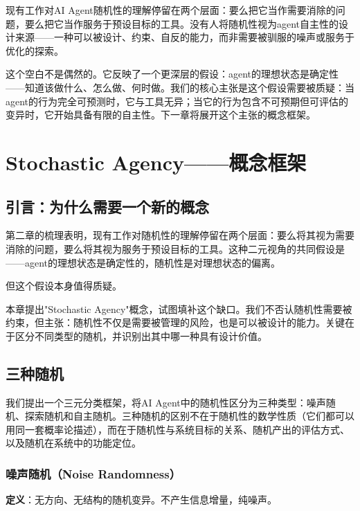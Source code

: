 \documentclass[12pt,a4paper]{ctexart}
\begin{document}
现有工作对AI Agent随机性的理解停留在两个层面：要么把它当作需要消除的问题，要么把它当作服务于预设目标的工具。没有人将随机性视为agent自主性的设计来源——一种可以被设计、约束、自反的能力，而非需要被驯服的噪声或服务于优化的探索。

这个空白不是偶然的。它反映了一个更深层的假设：agent的理想状态是确定性——知道该做什么、怎么做、何时做。我们的核心主张是这个假设需要被质疑：当agent的行为完全可预测时，它与工具无异；当它的行为包含不可预期但可评估的变异时，它开始具备有限的自主性。下一章将展开这个主张的概念框架。


\section{Stochastic Agency——概念框架}

\subsection{引言：为什么需要一个新的概念}

第二章的梳理表明，现有工作对随机性的理解停留在两个层面：要么将其视为需要消除的问题，要么将其视为服务于预设目标的工具。这种二元视角的共同假设是——agent的理想状态是确定性的，随机性是对理想状态的偏离。

但这个假设本身值得质疑。

本章提出"Stochastic Agency"概念，试图填补这个缺口。我们不否认随机性需要被约束，但主张：随机性不仅是需要被管理的风险，也是可以被设计的能力。关键在于区分不同类型的随机，并识别出其中哪一种具有设计价值。

\subsection{三种随机}

我们提出一个三元分类框架，将AI Agent中的随机性区分为三种类型：噪声随机、探索随机和自主随机。三种随机的区别不在于随机性的数学性质（它们都可以用同一套概率论描述），而在于随机性与系统目标的关系、随机产出的评估方式、以及随机在系统中的功能定位。

\subsubsection{噪声随机（Noise Randomness）}

\textbf{定义}：无方向、无结构的随机变异。不产生信息增量，纯噪声。
\end{document}

